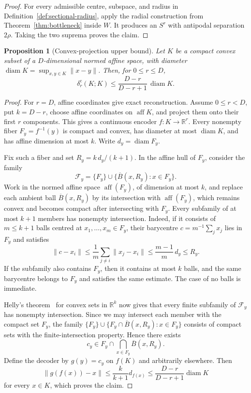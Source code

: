 \documentclass[11pt,a4paper]{article}
\theoremstyle{definition}
\theoremstyle{plain}
\newtheorem{proposition}[theorem]{Proposition}
\theoremstyle{remark}
\DeclareMathOperator{\diam}{diam}
\begin{document}
\begin{proof}
For every admissible centre, subspace, and radius in
Definition~\ref{def:sectional-radius}, apply the radial construction from
Theorem~\ref{thm:bottleneck} inside $W$. It produces an $S^r$ with
antipodal separation $2\rho$. Taking the two suprema proves the claim.
\end{proof}

\begin{proposition}[Convex-projection upper bound]
\label{prop:convex-projection-upper}
Let $K$ be a compact convex subset of a $D$-dimensional normed affine
space, with diameter $\diam K=\sup_{x,y\in K}\|x-y\|$. Then, for $0\leq r\leq D$,
\[
\delta_r^{\mathrm c}(K;K)
\leq
\frac{D-r}{D-r+1}\,\diam K.
\]
\end{proposition}

\begin{proof}
For $r=D$, affine coordinates give exact reconstruction. Assume
$0\leq r<D$, put $k=D-r$, choose affine coordinates on
$\operatorname{aff}K$, and project them onto their first $r$ components.
This gives a continuous encoder $f:K\to\mathbb R^r$. Every nonempty fiber
$F_y=f^{-1}(y)$ is compact and convex, has diameter at most $\diam K$, and
has affine dimension at most $k$. Write $d_y=\operatorname{diam}F_y$.

Fix such a fiber and set
$R_y=k\,d_y/(k+1)$. In the affine hull of $F_y$, consider the family
\[
\mathcal F_y
=\{F_y\}\cup\{\overline B(x,R_y):x\in F_y\}.
\]
Work in the normed affine space $\operatorname{aff}(F_y)$, of dimension at most $k$, and replace each ambient ball $\overline B(x,R_y)$ by its intersection with $\operatorname{aff}(F_y)$, which remains convex and becomes compact after intersecting with $F_y$. Every subfamily of at most $k+1$ members has nonempty intersection. Indeed,
if it consists of $m\leq k+1$ balls centred at
$x_1,\ldots,x_m\in F_y$, their barycentre $c=m^{-1}\sum_jx_j$ lies in
$F_y$ and satisfies
\[
\|c-x_i\|
\leq\frac1m\sum_{j\neq i}\|x_j-x_i\|
\leq\frac{m-1}{m}\,d_y
\leq R_y.
\]
If the subfamily also contains $F_y$, then it contains at most $k$ balls,
and the same barycentre belongs to $F_y$ and satisfies the same estimate.
The case of no balls is immediate.

Helly's theorem~\cite{Barvinok2002} for convex sets in $\mathbb R^k$ now gives that every finite subfamily of $\mathcal F_y$ has nonempty intersection. Since we may intersect each member with the compact set $F_y$, the family $\{F_y\}\cup\{F_y\cap\overline B(x,R_y):x\in F_y\}$ consists of compact sets with the finite-intersection property. Hence there exists
\[
c_y\in F_y\cap\bigcap_{x\in F_y}\overline B(x,R_y).
\]
Define the decoder by $g(y)=c_y$ on $f(K)$ and arbitrarily elsewhere. Then
\[
\|g(f(x))-x\|
\leq\frac{k}{k+1}d_{f(x)}
\leq\frac{D-r}{D-r+1}\diam K
\]
for every $x\in K$, which proves the claim.
\end{proof}
\end{document}

